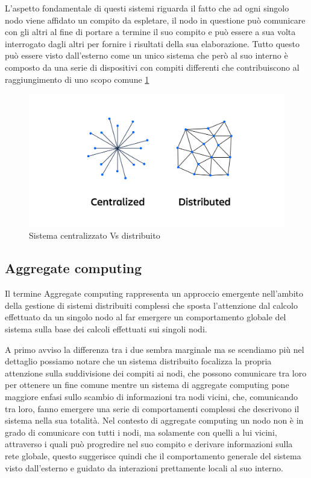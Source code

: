 \documentclass[12pt,a4paper,openright,twoside]{book}
\begin{document}
L'aspetto fondamentale di questi sistemi riguarda il fatto che ad ogni singolo \gls{nodo} viene affidato un compito da espletare, il nodo in questione può comunicare con gli altri al fine di portare a termine il suo compito e può essere a sua volta interrogato dagli altri per fornire i risultati della sua elaborazione.
Tutto questo può essere visto dall'esterno come un unico sistema che però al suo interno è composto da una serie di dispositivi con compiti differenti che contribuiscono al raggiungimento di uno scopo comune \ref{fig:centralizedVsDistributed}
\begin{figure}
	\centering
	\includegraphics[width=0.8\linewidth]{figures/centralizedVsDistributed.png}
	\caption{Sistema centralizzato Vs distribuito \cite{centralizedVsDistributed}}
	\label{fig:centralizedVsDistributed}
\end{figure}

\subsection{Aggregate computing}
Il termine Aggregate computing rappresenta un approccio emergente nell'ambito della gestione di sistemi distribuiti complessi \cite{VIROLI2019100486} che sposta l'attenzione dal calcolo effettuato da un singolo nodo al far emergere un comportamento globale del sistema sulla base dei calcoli effettuati sui singoli nodi.

A primo avviso la differenza tra i due sembra marginale ma se scendiamo più nel dettaglio possiamo notare che un sistema distribuito focalizza la propria attenzione sulla suddivisione dei compiti ai nodi, che possono comunicare tra loro per ottenere un fine comune mentre un sistema di aggregate computing pone maggiore enfasi sullo scambio di informazioni tra nodi vicini, che, comunicando tra loro, fanno emergere una serie di comportamenti complessi che descrivono il sistema nella sua totalità.
Nel contesto di aggregate computing un nodo non è in grado di comunicare con tutti i nodi, ma solamente con quelli a lui vicini, attraverso i quali può progredire nel suo compito e derivare informazioni sulla rete globale, questo suggerisce quindi che il comportamento generale del sistema visto dall'esterno e guidato da interazioni prettamente locali al suo interno.
\end{document}
